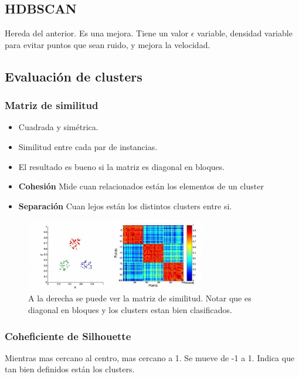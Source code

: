 \documentclass[titlepage,a4paper]{article}
\begin{document}
\subsection{HDBSCAN}
Hereda del anterior. Es una mejora. Tiene un valor $\epsilon$ variable, densidad variable para evitar puntos que sean ruido, y mejora la velocidad.

\subsection{Evaluación de clusters}

\subsubsection{Matriz de similitud}

\begin{itemize}
    \item Cuadrada y simétrica.
    \item Similitud entre cada par de instancias.
    \item El resultado es bueno si la matriz es diagonal en bloques.
    \item \textbf{Cohesión} Mide cuan relacionados están los elementos de un cluster
    \item \textbf{Separación} Cuan lejos están los distintos clusters entre si.
\end{itemize}

\begin{figure}[!htb]
    \centering
    \includegraphics[width=0.7\textwidth]{imagenesResumen/MatrizSimilitud.jpg}
    \caption{A la derecha se puede ver la matriz de similitud. Notar que es diagonal en bloques y los clusters estan bien clasificados.}
\end{figure}

\subsubsection{Coheficiente de Silhouette}
Mientras mas cercano al centro, mas cercano a 1. Se mueve de -1 a 1. Indica que tan bien definidos están los clusters.
\end{document}

